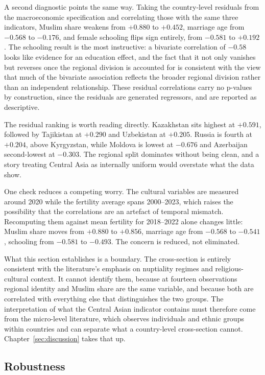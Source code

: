 A second diagnostic points the same way. Taking the country-level residuals from the macroeconomic specification and correlating those with the same three indicators, Muslim share weakens from $+0.880$ to $+0.452$, marriage age from $-0.568$ to $-0.176$, and female schooling flips sign entirely, from $-0.581$ to $+0.192$. The schooling result is the most instructive: a bivariate correlation of $-0.58$ looks like evidence for an education effect, and the fact that it not only vanishes but reverses once the regional division is accounted for is consistent with the view that much of the bivariate association reflects the broader regional division rather than an independent relationship. These residual correlations carry no p-values by construction, since the residuals are generated regressors, and are reported as descriptive.

The residual ranking is worth reading directly. Kazakhstan sits highest at $+0.591$, followed by Tajikistan at $+0.290$ and Uzbekistan at $+0.205$. Russia is fourth at $+0.204$, above Kyrgyzstan, while Moldova is lowest at $-0.676$ and Azerbaijan second-lowest at $-0.303$. The regional split dominates without being clean, and a story treating Central Asia as internally uniform would overstate what the data show.

One check reduces a competing worry. The cultural variables are measured around 2020 while the fertility average spans 2000--2023, which raises the possibility that the correlations are an artefact of temporal mismatch. Recomputing them against mean fertility for 2018--2022 alone changes little: Muslim share moves from $+0.880$ to $+0.856$, marriage age from $-0.568$ to $-0.541$, schooling from $-0.581$ to $-0.493$. The concern is reduced, not eliminated.

What this section establishes is a boundary. The cross-section is entirely consistent with the literature's emphasis on nuptiality regimes and religious-cultural context. It cannot identify them, because at fourteen observations regional identity and Muslim share are the same variable, and because both are correlated with everything else that distinguishes the two groups. The interpretation of what the Central Asian indicator contains must therefore come from the micro-level literature, which observes individuals and ethnic groups within countries and can separate what a country-level cross-section cannot. Chapter~\ref{sec:discussion} takes that up.

\subsection{Robustness}
\label{sec:robustness}


